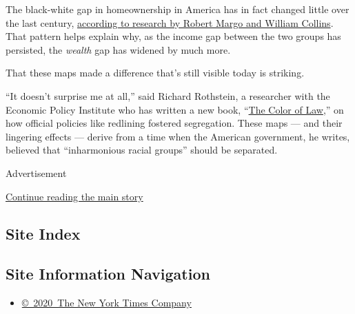 The black-white gap in homeownership in America has in fact changed
little over the last century,
\href{https://www.bu.edu/econ/files/2013/03/101122_sem777_Robert-Margo-Paper-1.pdf}{according
to research by Robert Margo and William Collins}. That pattern helps
explain why, as the income gap between the two groups has persisted, the
\emph{wealth} gap has widened by much more.

That these maps made a difference that's still visible today is
striking.

``It doesn't surprise me at all,'' said Richard Rothstein, a researcher
with the Economic Policy Institute who has written a new book,
``\href{http://www.epi.org/publication/the-color-of-law-a-forgotten-history-of-how-our-government-segregated-america/}{The
Color of Law},'' on how official policies like redlining fostered
segregation. These maps --- and their lingering effects --- derive from
a time when the American government, he writes, believed that
``inharmonious racial groups'' should be separated.

Advertisement

\protect\hyperlink{after-bottom}{Continue reading the main story}

\hypertarget{site-index}{%
\subsection{Site Index}\label{site-index}}

\hypertarget{site-information-navigation}{%
\subsection{Site Information
Navigation}\label{site-information-navigation}}

\begin{itemize}
\tightlist
\item
  \href{https://help.nytimes.com/hc/en-us/articles/115014792127-Copyright-notice}{©~2020~The
  New York Times Company}
\end{itemize}

